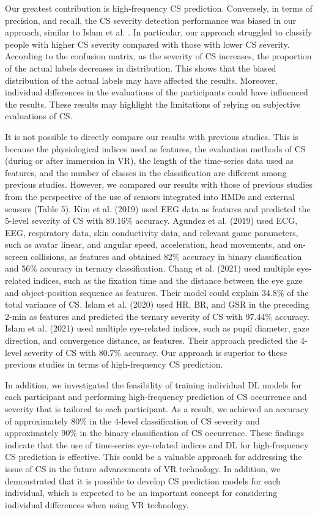 \documentclass{ieeeaccess}
\begin{document}
Our greatest contribution is high-frequency CS prediction. Conversely, in terms of precision, and recall, the CS severity detection performance was biased in our approach, similar to Islam et al. \cite{Islam_2021}. In particular, our approach struggled to classify people with higher CS severity compared with those with lower CS severity. According to the confusion matrix, as the severity of CS increases, the proportion of the actual labels decreases in distribution. This shows that the biased distribution of the actual labels may have affected the results. Moreover, individual differences in the evaluations of the participants could have influenced the results. These results may highlight the limitations of relying on subjective evaluations of CS.

It is not possible to directly compare our results with previous studies. This is because the physiological indices used as features, the evaluation methods of CS (during or after immersion in VR), the length of the time-series data used as features, and the number of classes in the classification are different among previous studies. However, we compared our results with those of previous studies from the perspective of the use of sensors integrated into HMDs and external sensors (Table 5). 
Kim et al. (2019) \cite{Kim_2019} used EEG data as features and predicted the 5-level severity of CS with 89.16\% accuracy. 
Agundez et al. (2019) \cite{Agundez_2019} used ECG, EEG, respiratory data, skin conductivity data, and relevant game parameters, such as avatar linear, and angular speed, acceleration, head movements, and on-screen collisions, as features and obtained 82\% accuracy in binary classification and 56\% accuracy in ternary classification. 
Chang et al. (2021) \cite{Chang_2021} used multiple eye-related indices, such as the fixation time and the distance between the eye gaze and object-position sequence as features. Their model could explain 34.8\% of the total variance of CS. 
Islam et al. (2020) \cite{Islam_2_2020} used HR, BR, and GSR in the preceding 2-min as features and predicted the ternary severity of CS with 97.44\% accuracy. 
Islam et al. (2021) \cite{Islam_2021} used multiple eye-related indices, such as pupil diameter, gaze direction, and convergence distance, as features. Their approach predicted the 4-level severity of CS with 80.7\% accuracy. Our approach is superior to these previous studies in terms of high-frequency CS prediction.

In addition, we investigated the feasibility of training individual DL models for each participant and performing high-frequency prediction of CS occurrence and severity that is tailored to each participant. As a result, we achieved an accuracy of approximately 80\% in the 4-level classification of CS severity and approximately 90\% in the binary classification of CS occurrence. 
These findings indicate that the use of time-series eye-related indices and DL for high-frequency CS prediction is effective. This could be a valuable approach for addressing the issue of CS in the future advancements of VR technology. In addition, we demonstrated that it is possible to develop CS prediction models for each individual, which is expected to be an important concept for considering individual differences when using VR technology.
\end{document}
